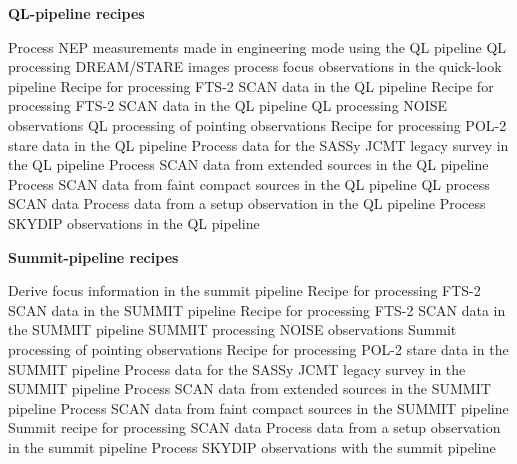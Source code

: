 \documentclass[twoside,11pt,nolof]{starlink}
\begin{document}
\begin{small}
{\large
\begin{center}
\textbf{QL-pipeline recipes}
\end{center}
}
\begin{description}
Process NEP measurements made in engineering mode using the QL pipeline
QL processing DREAM/STARE images
process focus observations in the quick-look pipeline
Recipe for processing FTS-2 SCAN data in the QL pipeline
Recipe for processing FTS-2 SCAN data in the QL pipeline
QL processing NOISE observations
QL processing of pointing observations
Recipe for processing POL-2 stare data in the QL pipeline
Process data for the SASSy JCMT legacy survey in the QL pipeline
Process SCAN data from extended sources in the QL pipeline
Process SCAN data from faint compact sources in the QL pipeline
QL process SCAN data
Process data from a setup observation in the QL pipeline
Process SKYDIP observations in the QL pipeline
\end{description}

{\large
\begin{center}
\textbf{Summit-pipeline recipes}
\end{center}
}
\begin{description}
Derive focus information in the summit pipeline
Recipe for processing FTS-2 SCAN data in the SUMMIT pipeline
Recipe for processing FTS-2 SCAN data in the SUMMIT pipeline
SUMMIT processing NOISE observations
Summit processing of pointing observations
Recipe for processing POL-2 stare data in the SUMMIT pipeline
Process data for the SASSy JCMT legacy survey in the SUMMIT pipeline
Process SCAN data from extended sources in the SUMMIT pipeline
Process SCAN data from faint compact sources in the SUMMIT pipeline
Summit recipe for processing SCAN data
Process data from a setup observation in the summit pipeline
Process SKYDIP observations with the summit pipeline
\end{description}


\end{small}
\end{document}
